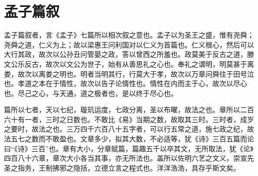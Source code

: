 \chapter*{孟子篇叙}

孟子篇叙者，言《孟子》七篇所以相次叙之意也。孟子以为圣王之盛，惟有尧舜；尧舜之道，仁义为上；故以梁惠王问利国对以仁义为首篇也。仁义根心，然后可以大行其政，故次以公孙丑问管晏之政，答以曾西之所羞也。政莫美于反古之道，滕文公乐反古，故次以文公为世子，始有从善思礼之心也。奉礼之谓明，明莫甚于离娄，故次以离娄之明也。明者当明其行，行莫大于孝，故次以万章问舜往于田号泣也。孝道之本在于情性，故次以告子论情性也。情性在内而主于心，故次以尽心也。尽己之心，与天通，道之极者也，是以终于尽心也。

篇所以七者，天以七纪，璇玑运度，七政分离，圣以布曜，故法之也。章所以二百六十有一者，三时之日数也。不敢比《易》当期之数，故取其三时。三时者，成岁之要时，故法之也。三万四千六百八十五字者，可以行五常之道，施七政之纪，故法五七之数而不敢盈也。文章多少，拟其大数，不必适等，犹《诗》三百五篇而论曰“《诗》三百”也。章有大小，分章赋篇，篇趣五千以卒其文，无所取法，犹《论》四百八十六章，章次大小各当其事，亦无所法也。盖所以佐明六艺之文义，崇宣先圣之指务，王制拂邪之隐括，立德立言之程式也。洋洋浩浩，具存乎斯文矣。